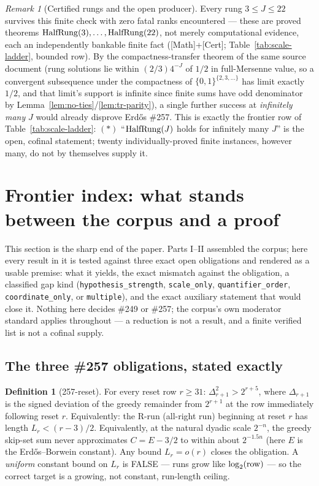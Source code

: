 \documentclass[11pt]{article}
\theoremstyle{plain}
\theoremstyle{definition}
\newtheorem{defn}[thm]{Definition}
\theoremstyle{remark}
\newtheorem{rem}[thm]{Remark}
\let\origmathrm\mathrm
\renewcommand{\mathrm}[1]{\ifmmode\origmathrm{#1}\else\textrm{#1}\fi}%
\newcommand{\ev}[1]{{\small\textsf{[#1]}}\xspace}
\begin{document}
\begin{rem}[Certified rungs and the open producer]
Every rung $3\le J\le22$ survives this finite check with zero fatal ranks encountered — these are
proved theorems $\mathrm{HalfRung}(3),\ldots,\mathrm{HalfRung}(22)$, not merely computational
evidence, each an independently bankable finite fact (\ev{Math}+\ev{Cert};
Table~\ref{tab:scale-ladder}, bounded row). By the compactness-transfer theorem of the same source
document (rung solutions lie within $(2/3)4^{-J}$ of $1/2$ in full-Mersenne value, so a convergent
subsequence under the compactness of $\{0,1\}^{\{2,3,\ldots\}}$ has limit exactly $1/2$, and that
limit's support is infinite since finite sums have odd denominator by
Lemma~\ref{lem:no-ties}/\ref{lem:tr-parity}), a single further success at \emph{infinitely many} $J$
would already disprove Erdős \#257. This is exactly the frontier row of Table~\ref{tab:scale-ladder}:
$(\ast)$ ``$\mathrm{HalfRung}(J)$ holds for infinitely many $J$'' is the open, cofinal statement;
twenty individually-proved finite instances, however many, do not by themselves supply it.
\end{rem}
\section{Frontier index: what stands between the corpus and a proof}

This section is the sharp end of the paper. Parts I--II assembled the corpus; here every
result in it is tested against three exact open obligations and rendered as a usable premise:
what it yields, the exact mismatch against the obligation, a classified gap kind
(\texttt{hypothesis\_strength}, \texttt{scale\_only}, \texttt{quantifier\_order},
\texttt{coordinate\_only}, or \texttt{multiple}), and the exact auxiliary statement that would
close it. Nothing here decides \#249 or \#257; the corpus's own moderator standard applies
throughout — a reduction is not a result, and a finite verified list is not a cofinal supply.

\subsection{The three \#257 obligations, stated exactly}

\begin{defn}[257-reset]
For every reset row $r \ge 31$: $\Delta_{r+1}^2 > 2^{r+5}$, where $\Delta_{r+1}$ is the signed
deviation of the greedy remainder from $2^{r+1}$ at the row immediately following reset $r$.
Equivalently: the R-run (all-right run) beginning at reset $r$ has length $L_r < (r-3)/2$.
Equivalently, at the natural dyadic scale $2^{-n}$, the greedy skip-set sum never approximates
$C = E - 3/2$ to within about $2^{-1.5n}$ (here $E$ is the Erdős--Borwein constant). Any bound
$L_r = o(r)$ closes the obligation. A \emph{uniform} constant bound on $L_r$ is FALSE — runs
grow like $\log_2(\mathrm{row})$ — so the correct target is a growing, not constant, run-length
ceiling.
\end{defn}
\end{document}
